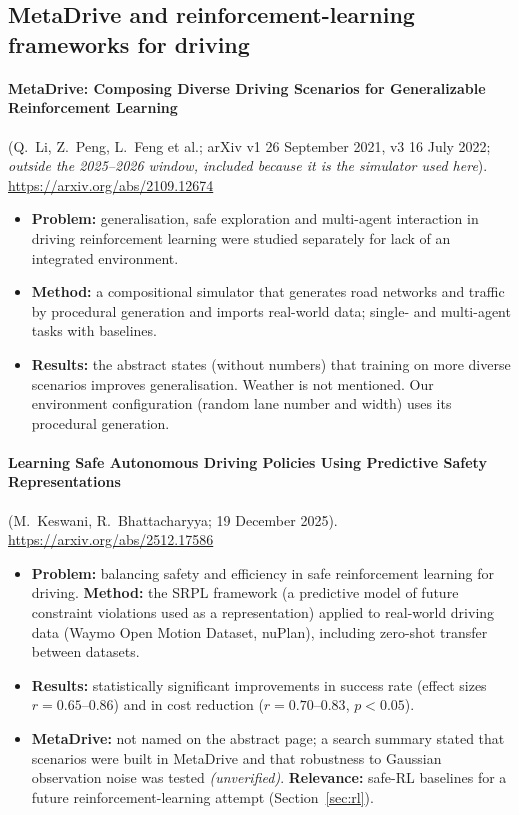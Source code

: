\subsection{MetaDrive and reinforcement-learning frameworks for driving}

\paragraph{MetaDrive: Composing Diverse Driving Scenarios for Generalizable Reinforcement Learning} (Q.~Li, Z.~Peng, L.~Feng et al.; arXiv v1 26 September 2021, v3 16 July 2022; \emph{outside the 2025--2026 window, included because it is the simulator used here}). \url{https://arxiv.org/abs/2109.12674}
\begin{itemize}
\item \textbf{Problem:} generalisation, safe exploration and multi-agent interaction in driving reinforcement learning were studied separately for lack of an integrated environment.
\item \textbf{Method:} a compositional simulator that generates road networks and traffic by procedural generation and imports real-world data; single- and multi-agent tasks with baselines.
\item \textbf{Results:} the abstract states (without numbers) that training on more diverse scenarios improves generalisation. Weather is not mentioned. Our environment configuration (random lane number and width) uses its procedural generation.
\end{itemize}

\paragraph{Learning Safe Autonomous Driving Policies Using Predictive Safety Representations} (M.~Keswani, R.~Bhattacharyya; 19 December 2025). \url{https://arxiv.org/abs/2512.17586}
\begin{itemize}
\item \textbf{Problem:} balancing safety and efficiency in safe reinforcement learning for driving. \textbf{Method:} the SRPL framework (a predictive model of future constraint violations used as a representation) applied to real-world driving data (Waymo Open Motion Dataset, nuPlan), including zero-shot transfer between datasets.
\item \textbf{Results:} statistically significant improvements in success rate (effect sizes $r=0.65$--$0.86$) and in cost reduction ($r=0.70$--$0.83$, $p<0.05$).
\item \textbf{MetaDrive:} not named on the abstract page; a search summary stated that scenarios were built in MetaDrive and that robustness to Gaussian observation noise was tested \emph{(unverified)}. \textbf{Relevance:} safe-RL baselines for a future reinforcement-learning attempt (Section~\ref{sec:rl}).
\end{itemize}

